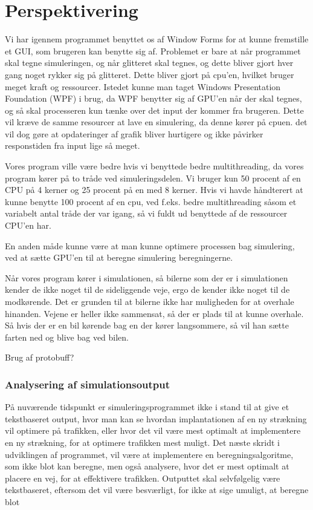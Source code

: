 \chapter{Perspektivering}\label{Perspektivering}
Vi har igennem programmet benyttet os af Window Forms for at kunne fremstille et GUI, som brugeren kan benytte sig af. Problemet er bare at når programmet skal tegne simuleringen, og når glitteret skal tegnes, og dette bliver gjort hver gang noget rykker sig på glitteret. Dette bliver gjort på cpu'en, hvilket bruger meget kraft og ressourcer. Istedet kunne man taget Windows Presentation Foundation (WPF) i brug, da WPF benytter sig af GPU'en når der skal tegnes, og så skal processeren kun tænke over det input der kommer fra brugeren. Dette vil kræve de samme resourcer at lave en simulering, da denne kører på cpuen. det vil dog gøre at opdateringer af grafik bliver hurtigere og ikke påvirker responstiden fra input lige så meget.


\vspace{5mm}

Vores program ville være bedre hvis vi benyttede bedre multithreading, da vores program kører på to tråde ved simuleringsdelen. Vi bruger kun 50 procent af en CPU på 4 kerner og 25 procent på en med 8 kerner. Hvis vi havde håndterert at kunne benytte 100 procent af en cpu, ved f.eks. bedre multithreading såsom et variabelt antal tråde der var igang, så vi fuldt ud benyttede af de ressourcer CPU'en har.

\vspace{5mm}

En anden måde kunne være at man kunne optimere processen bag simulering, ved at sætte GPU'en til at beregne simulering beregningerne.

\vspace{5mm}

Når vores program kører i simulationen, så bilerne som der er i simulationen kender de ikke noget til de sideliggende veje, ergo de kender ikke noget til de modkørende. Det er grunden til at bilerne ikke har muligheden for at overhale hinanden. Vejene er heller ikke sammensat, så der er plads til at kunne overhale. Så hvis der er en bil kørende bag en der kører langsommere, så vil han sætte farten ned og blive bag ved bilen.

\vspace{5mm}

Brug af protobuff?

\subsection{Analysering af simulationsoutput}
På nuværende tidspunkt er simuleringsprogrammet ikke i stand til at give et tekstbaseret output, hvor man kan se hvordan implantationen af en ny strækning vil optimere på trafikken, eller hvor det vil være mest optimalt at implementere en ny strækning, for at optimere trafikken mest muligt. Det næste skridt i udviklingen af programmet, vil være at implementere en beregningsalgoritme, som ikke blot kan beregne, men også analysere, hvor det er mest optimalt at placere en vej, for at effektivere trafikken. Outputtet skal selvfølgelig være tekstbaseret, eftersom det vil være besværligt, for ikke at sige umuligt, at beregne blot 